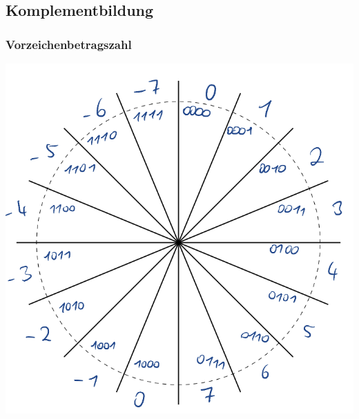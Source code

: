 \documentclass[12pt,a4paper]{article}
\begin{document}
	\subsection{Komplementbildung}
	\begin{minipage}[t]{0.5\textwidth}
		\subsubsection{Vorzeichenbetragszahl}
			\includegraphics[width=\textwidth]{Bilder/einerkomplement.PNG}
	\end{minipage}
\end{document}
